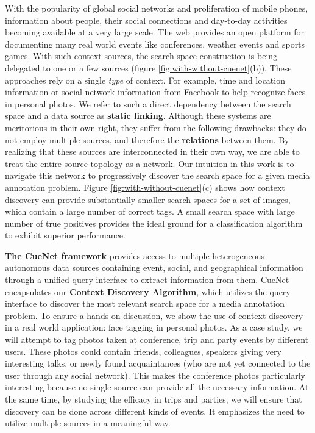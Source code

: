 With the popularity of global social networks and proliferation of mobile phones, information about people, their social connections and day-to-day activities becoming available at a very large scale. The web provides an open platform for documenting many real world events like conferences, weather events and sports games. With such context sources, the search space construction is being delegated to one or a few sources \cite{henter2012tag, li2012fusing, naaman2005identity, o2009context,  stone2008autotagging} (figure \ref{fig:with-without-cuenet}(b)). These approaches rely on a single \textit{type} of context. For example, time and location information or social network information from Facebook to help recognize faces in personal photos. We refer to such a direct dependency between the search space and a data source as \textbf{static linking}. Although these systems are meritorious in their own right, they suffer from the following drawbacks: they do not employ multiple sources, and therefore the \textbf{relations} between them. By realizing that these sources are interconnected in their own way, we are able to treat the entire source topology as a network. Our intuition in this work is to navigate this network to progressively discover the search space for a given media annotation problem. Figure \ref{fig:with-without-cuenet}(c) shows how context discovery can provide substantially smaller search spaces for a set of images, which contain a large number of correct tags. A small search space with large number of true positives provides the ideal ground for a classification algorithm to exhibit superior performance.

\textbf{The CueNet framework} provides access to multiple heterogeneous autonomous data sources containing event, social, and geographical information through a unified query interface to extract information from them. CueNet encapsulates our \textbf{Context Discovery Algorithm}, which utilizes the query interface to discover the most relevant search space for a media annotation problem. To ensure a hands-on discussion, we show the use of context discovery in a real world application: face tagging in personal photos. As a case study, we will attempt to tag photos taken at conference, trip and party events by different users. These photos could contain friends, colleagues, speakers giving very interesting talks, or newly found acquaintances (who are not yet connected to the user through any social network). This makes the conference photos particularly interesting because no single source can provide all the necessary information. At the same time, by studying the efficacy in trips and parties, we will ensure that discovery can be done across different kinds of events. It emphasizes the need to utilize multiple sources in a meaningful way.

